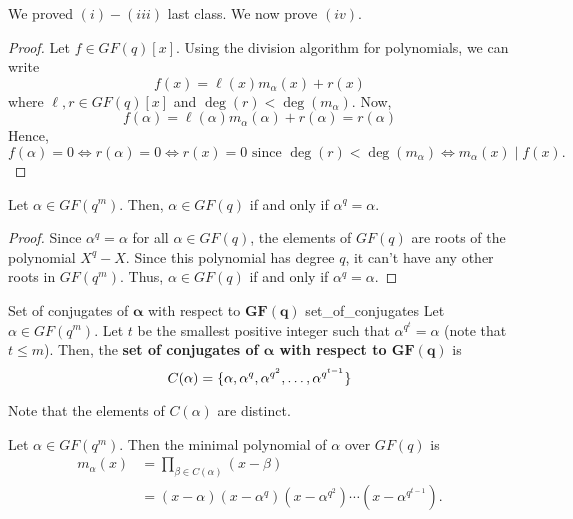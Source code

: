 We proved $ (i)-(iii) $ last class. We now prove $ (iv) $.
\begin{proof}
    Let $ f\in GF(q)[x] $. Using the division algorithm for polynomials,
    we can write
    \[ f(x)=\ell(x)m_\alpha(x)+r(x) \]
    where $ \ell,r\in GF(q)[x] $ and $ \deg(r)<\deg(m_\alpha) $. Now,
    \[ f(\alpha)=\ell(\alpha)m_\alpha(\alpha)+r(\alpha)=r(\alpha) \]
    Hence,
    \[ f(\alpha)=0\iff r(\alpha)=0\iff r(x)=0 \text{ since }\deg(r)<\deg(m_\alpha)\iff
        m_\alpha(x)\mid f(x). \]
\end{proof}

\begin{Theorem}{}{}
    Let $ \alpha\in GF(q^m) $. Then, $ \alpha\in GF(q) $ if and only if
    $ \alpha^q=\alpha $.
\end{Theorem}

\begin{proof}
    Since $ \alpha^q=\alpha $ for all $ \alpha\in GF(q) $, the elements of $ GF(q) $
    are roots of the polynomial $ X^q-X $. Since this polynomial has degree $ q $,
    it can't have any other roots in $ GF(q^m) $. Thus, $ \alpha\in GF(q) $
    if and only if $ \alpha^q=\alpha $.
\end{proof}

\begin{Definition}{Set of conjugates of $ \bm{\alpha} $ with respect to $ \bm{GF(q)} $}{
        set_of_conjugates
    }
    Let $ \alpha\in GF(q^m) $. Let $ t $ be the smallest positive integer such that
    $ \alpha^{q^t}=\alpha $ (note that $ t\leqslant m $). Then, the
    \textbf{set of conjugates of $ \bm{\alpha} $ with respect to $ \bm{GF(q)} $} is
    \[ C(\alpha)=\{\alpha,\alpha^q,\alpha^{q^2},\ldots,\alpha^{q^{t-1}}\} \]

    Note that the elements of $ C(\alpha) $ are distinct.
\end{Definition}

\begin{Theorem}{}{}
    Let $ \alpha\in GF(q^m) $. Then the minimal polynomial of $ \alpha $ over
    $ GF(q) $ is
    \begin{align*}
        m_\alpha(x)
         & =\prod_{\beta\in C(\alpha)}(x-\beta)                               \\
         & =(x-\alpha)(x-\alpha^q)(x-\alpha^{q^2})\cdots(x-\alpha^{q^{t-1}}).
    \end{align*}
\end{Theorem}

